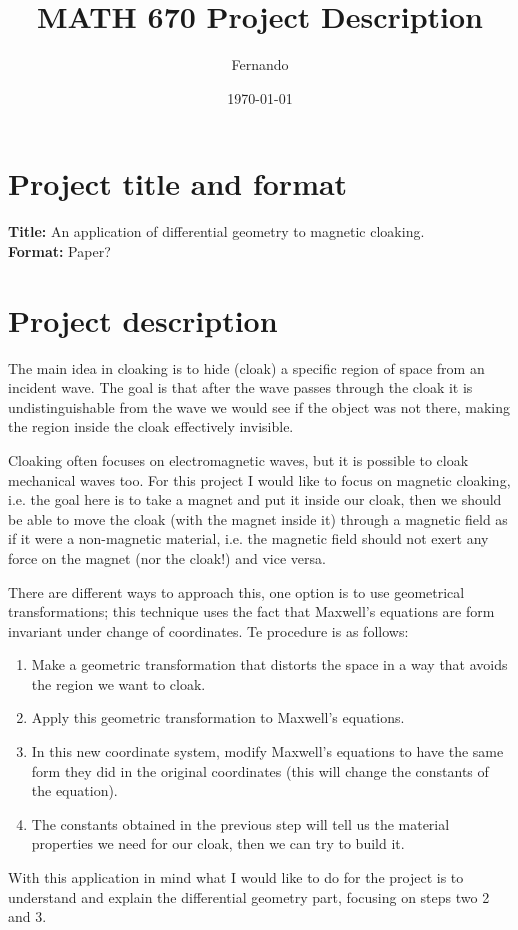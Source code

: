 \documentclass{article}
\begin{document}
\newcommand{\R}{\mathbb{R}}

\title{MATH 670 Project Description}
\author{Fernando}
\date{\today}
\maketitle

\section*{Project title and format}

\textbf{Title:} An application of differential geometry to magnetic cloaking.\\
\textbf{Format:} Paper?

\section*{Project description}

The main idea in cloaking is to hide (cloak) a specific region of space from an
incident wave. The goal is that after the wave passes through the cloak it is
undistinguishable from the wave we would see if the object was not there,
making the region inside the cloak effectively invisible.

Cloaking often focuses on electromagnetic waves, but it is possible to cloak
mechanical waves too. For this project I would like to focus on magnetic
cloaking, i.e. the goal here is to take a magnet and put it inside our cloak,
then we should be able to move the cloak (with the magnet inside it) through a
magnetic field as if it were a non-magnetic material, i.e. the magnetic field
should not exert any force on the magnet (nor the cloak!) and vice versa.

There are different ways to approach this, one option is to use geometrical
transformations; this technique uses the fact that Maxwell's equations are form
invariant under change of coordinates. Te procedure is as follows:
\begin{enumerate}
\item

Make a geometric transformation that distorts the space in a way that avoids
the region we want to cloak.

\item

Apply this geometric transformation to Maxwell's equations.

\item

In this new coordinate system, modify Maxwell's equations to have the same
form they did in the original coordinates (this will change the constants of
the equation).

\item

The constants obtained in the previous step will tell us the material
properties we need for our cloak, then we can try to build it.

\end{enumerate}


With this application in mind what I would like to do for the project is to
understand and explain the differential geometry part, focusing on steps two 2
and 3.
\end{document}
